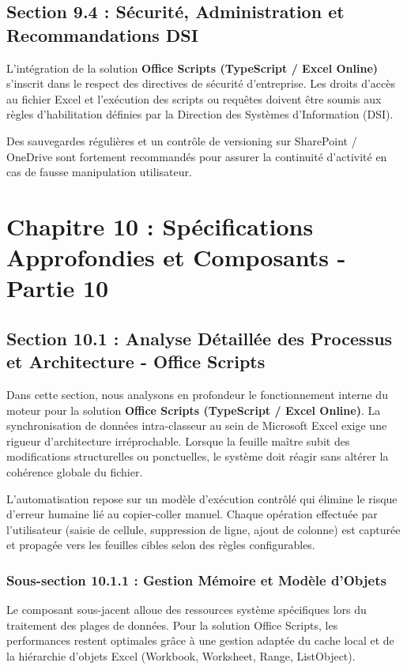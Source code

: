 \documentclass[12pt,a4paper]{report}
\begin{document}
\section{Section 9.4 : Sécurité, Administration et Recommandations DSI}
L'intégration de la solution \textbf{Office Scripts (TypeScript / Excel Online)} s'inscrit dans le respect des directives de sécurité d'entreprise. Les droits d'accès au fichier Excel et l'exécution des scripts ou requêtes doivent être soumis aux règles d'habilitation définies par la Direction des Systèmes d'Information (DSI).

Des sauvegardes régulières et un contrôle de versioning sur SharePoint / OneDrive sont fortement recommandés pour assurer la continuité d'activité en cas de fausse manipulation utilisateur.


\chapter{Chapitre 10 : Spécifications Approfondies et Composants - Partie 10}

\section{Section 10.1 : Analyse Détaillée des Processus et Architecture - Office Scripts}
Dans cette section, nous analysons en profondeur le fonctionnement interne du moteur pour la solution \textbf{Office Scripts (TypeScript / Excel Online)}. La synchronisation de données intra-classeur au sein de Microsoft Excel exige une rigueur d'architecture irréprochable. Lorsque la feuille maître subit des modifications structurelles ou ponctuelles, le système doit réagir sans altérer la cohérence globale du fichier.

L'automatisation repose sur un modèle d'exécution contrôlé qui élimine le risque d'erreur humaine lié au copier-coller manuel. Chaque opération effectuée par l'utilisateur (saisie de cellule, suppression de ligne, ajout de colonne) est capturée et propagée vers les feuilles cibles selon des règles configurables.


\subsection{Sous-section 10.1.1 : Gestion Mémoire et Modèle d'Objets}
Le composant sous-jacent alloue des ressources système spécifiques lors du traitement des plages de données. Pour la solution Office Scripts, les performances restent optimales grâce à une gestion adaptée du cache local et de la hiérarchie d'objets Excel (Workbook, Worksheet, Range, ListObject).
\end{document}

